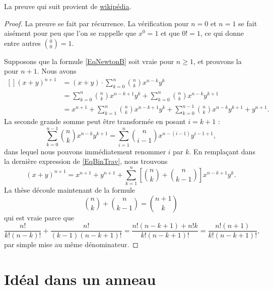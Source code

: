 La preuve qui suit provient de \href{http://fr.wikipedia.org/wiki/Formule_du_binôme_de_Newton}{wikipédia}.
\begin{proof}
    La preuve se fait par récurrence. La vérification pour $n=0$ et $n=1$ se fait aisément pour peu que l'on se rappelle que \( x^0=1\) et que \( 0!=1\), ce qui donne entre autres \( {0\choose 0}=1\).
    
    Supposons que la formule \eqref{EqNewtonB} soit vraie pour $n\geq1$, et prouvons la pour $n+1$. Nous avons
\begin{equation}        \label{EqBinTrav}
    \begin{aligned}[]
        (x+y)^{n+1} &=(x+y)\cdot  \sum_{k=0}^n{n\choose k}x^{n-k}y^k\\
                &= \sum_{k=0}^n{n\choose k}x^{n-k+1}y^k+\sum_{k=0}^n{n\choose k}x^{n-k}y^{k+1}\\
                &=x^{n+1}+ \sum_{k=1}^n{n\choose k}x^{n-k+1}y^k+\sum_{k=0}^{n-1}{n\choose k}x^{n-k}y^{k+1}+y^{n+1}.
    \end{aligned}
\end{equation}
La seconde grande somme peut être transformée en posant $i=k+1$ :
\begin{equation}
    \sum_{k=0}^{n-1}{n\choose k}x^{n-k}y^{k+1}  =\sum_{i=1}^n{n\choose i-1}x^{n-(i-1)}y^{i-1+1},
\end{equation}
dans lequel nous pouvons immédiatement renommer $i$ par $k$. En remplaçant dans la dernière expression de \eqref{EqBinTrav}, nous trouvons
\begin{equation}
    (x+y)^{n+1}=x^{n+1}+y^{n+1}+\sum_{k=1}^n\left[ {n\choose k}+{n\choose k-1} \right]x^{n-k+1}y^k.
\end{equation}
La thèse découle maintenant de la formule
\begin{equation}
    {n\choose k}+{n\choose k-1}={n+1\choose k}
\end{equation}
qui est vraie parce que
\begin{equation}
    \frac{ n! }{ k!(n-k)! }+\frac{ n! }{ (k-1)(n-k+1)! }=\frac{ n!(n-k+1)+n!k }{ k!(n-k+1)! }=\frac{ n!(n+1) }{  k!(n-k+1)!  },
\end{equation}
par simple mise au même dénominateur.
\end{proof}

\section{Idéal dans un anneau}

